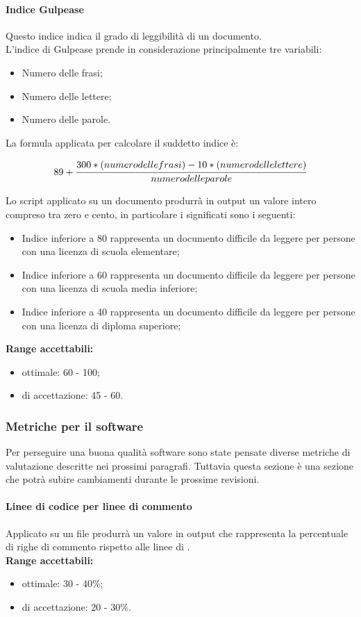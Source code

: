 \documentclass{scalatekids-article}
\begin{document}
\paragraph{Indice Gulpease}
\label{par:metricheGulpease}
Questo indice indica il grado di leggibilità di un documento.\\L'indice di Gulpease prende in considerazione principalmente tre variabili:
\begin{itemize}
\item Numero delle frasi;
\item Numero delle lettere;
\item Numero delle parole.
\end{itemize}
La formula applicata per calcolare il suddetto indice è:
\begin{center}
\begin{equation}
  89 + \cfrac{300 * (numero delle frasi) - 10 * (numero delle lettere)}{numero delle parole}
\end{equation}
\end{center}
Lo script applicato su un documento produrrà in output un valore intero compreso tra zero e cento, in particolare i significati sono i seguenti:
\begin{itemize}
  \item Indice inferiore a 80 rappresenta un documento difficile da leggere per persone con una licenza di scuola elementare;
  \item Indice inferiore a 60 rappresenta un documento difficile da leggere per persone con una licenza di scuola media inferiore;
  \item Indice inferiore a 40 rappresenta un documento difficile da leggere per persone con una licenza di diploma superiore;
\end{itemize}
\textbf{Range accettabili:}
\begin{itemize}
  \item {} ottimale: 60 - 100;
  \item {} di accettazione: 45 - 60.
\end{itemize}
\subsubsection{Metriche per il software}
\label{sec:metricheSW}
Per perseguire una buona qualità software sono state pensate diverse metriche di valutazione descritte nei prossimi paragrafi. Tuttavia questa sezione è una sezione che potrà subire cambiamenti durante le prossime revisioni.
\paragraph{Linee di codice per linee di commento}
Applicato su un file produrrà un valore in output che rappresenta la percentuale di righe di commento rispetto alle linee di .\\
\textbf{Range accettabili:}
\begin{itemize}
  \item {} ottimale: 30 - 40\%;
  \item {} di accettazione: 20 - 30\%.
\end{itemize}
\end{document}
